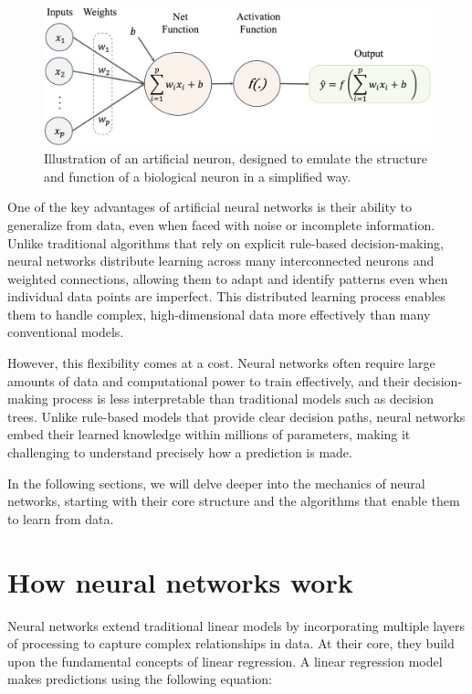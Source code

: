 \documentclass[
]{book}
\theoremstyle{definition}
\theoremstyle{definition}
\theoremstyle{definition}
\theoremstyle{definition}
\theoremstyle{remark}
\begin{document}
\begin{figure}

{\centering \includegraphics[width=0.9\linewidth]{images/ch12_net_1} 

}

\caption{Illustration of an artificial neuron, designed to emulate the structure and function of a biological neuron in a simplified way.}\label{fig:net-1}
\end{figure}

One of the key advantages of artificial neural networks is their ability to generalize from data, even when faced with noise or incomplete information. Unlike traditional algorithms that rely on explicit rule-based decision-making, neural networks distribute learning across many interconnected neurons and weighted connections, allowing them to adapt and identify patterns even when individual data points are imperfect. This distributed learning process enables them to handle complex, high-dimensional data more effectively than many conventional models.

However, this flexibility comes at a cost. Neural networks often require large amounts of data and computational power to train effectively, and their decision-making process is less interpretable than traditional models such as decision trees. Unlike rule-based models that provide clear decision paths, neural networks embed their learned knowledge within millions of parameters, making it challenging to understand precisely how a prediction is made.

In the following sections, we will delve deeper into the mechanics of neural networks, starting with their core structure and the algorithms that enable them to learn from data.

\section{How neural networks work}\label{how-neural-networks-work}

Neural networks extend traditional linear models by incorporating multiple layers of processing to capture complex relationships in data. At their core, they build upon the fundamental concepts of linear regression. A linear regression model makes predictions using the following equation:
\end{document}
